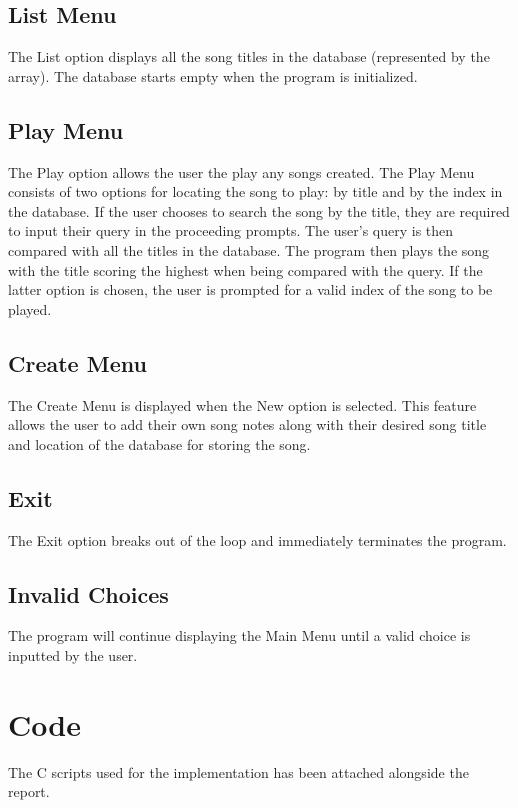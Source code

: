 \documentclass[usletter, 12pt]{article}
\begin{document}
        \subsection{List Menu}
        The List option displays all the song titles in the database (represented by the \codeword{song_title_list[}\codeword{][}\codeword{]} array). The database starts empty when the program is initialized.

        \subsection{Play Menu}
        The Play option allows the user the play any songs created. The Play Menu consists of two options for locating the song to play: by title and by the index in the database. If the user chooses to search the song by the title, they are required to input their query in the proceeding prompts. The user's query is then compared with all the titles in the database. The program then plays the song with the title scoring the highest when being compared with the query. If the latter option is chosen, the user is prompted for a valid index of the song to be played.

        \subsection{Create Menu}
        The Create Menu is displayed when the New option is selected. This feature allows the user to add their own song notes along with their desired song title and location of the database for storing the song.

        \subsection{Exit}
        The Exit option breaks out of the loop and immediately terminates the program.

        \subsection{Invalid Choices}
        The program will continue displaying the Main Menu until a valid choice is inputted by the user.


    \section{Code}
    The C scripts used for the implementation has been attached alongside the report.
\end{document}
